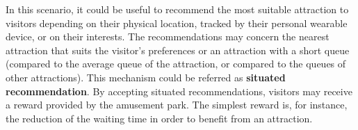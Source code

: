 In this scenario, it could be useful to recommend the most suitable attraction to visitors depending on their physical location, tracked by their personal wearable device, or on their interests.
The recommendations may concern the nearest attraction that suits the visitor's preferences or an attraction with a short queue (compared to the average queue of the attraction, or compared to the queues of other attractions).
This mechanism could be referred as \textbf{situated recommendation}.
By accepting situated recommendations, visitors may receive a reward provided by the amusement park.
The simplest reward is, for instance, the reduction of the waiting time in order to benefit from an attraction.
